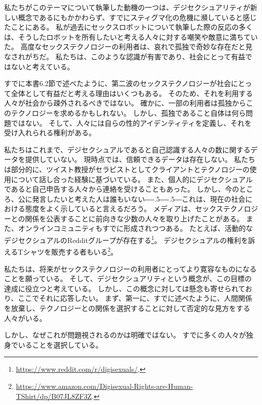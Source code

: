 \documentclass[paper=a4,book,openany]{jlreq}
\def\DDASH{―\kern-.5\zw―\kern-.5\zw―} %
\begin{document}
私たちがこのテーマについて執筆した動機の一つは、デジセクシュアリティが新しい概念であるにもかかわらず、すでにスティグマ化の危機に瀕していると感じたことにある。
私が過去にセックスロボットについて執筆した際の反応の多くは、そうしたロボットを所有したいと考える人々に対する嘲笑や敵意に満ちていた。
高度なセックステクノロジーの利用者は、哀れで孤独で奇妙な存在だと見なされがちだ。
私たちは、このような認識が有害であり、社会にとって有益ではないと考えている。

すでに本書6.2節で述べたように、第二波のセックステクノロジーが社会にとって全体として有益だと考える理由はいくつもある。
そのため、それを利用する人々が社会から疎外されるべきではない。
確かに、一部の利用者は孤独からこのテクノロジーを求めるかもしれない。
しかし、孤独であること自体は何ら問題ではない。
そして、人々には自らの性的アイデンティティを定義し、それを受け入れられる権利がある。

私たちはこれまで、デジセクシュアルであると自己認識する人々の数に関するデータを提供していない。
現時点では、信頼できるデータは存在しない。
私たちは部分的に、ツイスト教授がセラピストとしてクライアントとテクノロジーの使用について話し合った経験に基づいている。
また、個人的にデジセクシュアルであると自己申告する人々から連絡を受けることもあった。
しかし、今のところ、公に発言したいと考えた人は誰もいない{\DDASH}これは、現在の社会における態度をよく示していると言えるだろう。
メディアは、セックステクノロジーとの関係を公表することに前向きな少数の人々を取り上げたことがある\citep{haas17:_chines_man_marries_robot_he_built_himsel,jozuka18:_beyon_dimen,weiss19:_these_men_love_their_sex}。
また、オンラインコミュニティもすでに形成されつつある。
たとえば、活動的なデジセクシュアルのRedditグループが存在する\footnote{\url{https://www.reddit.com/r/digisexuals/}.}。
デジセクシュアルの権利を訴えるTシャツを販売する者もいる\footnote{\url{https://www.amazon.com/Digisexual-Rights-are-Human-TShirt/dp/B07JL8ZF3Z}.}。

私たちは、将来がセックステクノロジーの利用者にとってより寛容なものになることを願っている。
そして、デジセクシュアリティという概念が、この目標の達成に役立つと考えている。
しかし、この概念に対しては懸念も寄せられており、ここでそれに応答したい。
まず、第一に、すでに述べたように、人間関係を放棄し、テクノロジーとの関係を選択することに対して否定的な見方をする人々がいる。

しかし、なぜこれが問題視されるのかは明確ではない。
すでに多くの人々が独身でいることを選択している\citep{depaulo17:_how_many_americ_want_be_singl}。
\end{document}
